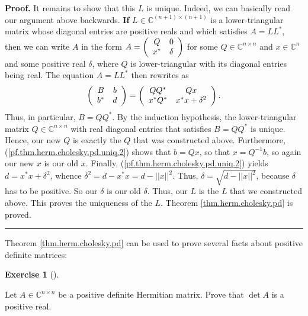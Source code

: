 \documentclass[numbers=enddot,12pt,final,onecolumn,notitlepage]{scrartcl}%
\newcounter{exer}
\numberwithin{exer}{subsection}
\theoremstyle{definition}
\newtheorem{exmp}[exer]{Exercise}
\newenvironment{exercise}[1][]
{\begin{exmp}[#1]\begin{leftbar}}
{\end{leftbar}\end{exmp}}
\newenvironment{proof}[1][Proof]{\noindent\textbf{#1.} }{\ \rule{0.5em}{0.5em}}
\begin{document}
\begin{proof}
It remains to show that this $L$ is unique. Indeed, we can basically read our
argument above backwards. \textbf{If} $L\in\mathbb{C}^{\left(  n+1\right)
\times\left(  n+1\right)  }$ is a lower-triangular matrix whose diagonal
entries are positive reals and which satisfies $A=LL^{\ast}$, then we can
write $A$ in the form $A=\left(
\begin{array}
[c]{cc}%
Q & 0\\
x^{\ast} & \delta
\end{array}
\right)  $ for some $Q\in\mathbb{C}^{n\times n}$ and $x\in\mathbb{C}^{n}$ and
some positive real $\delta$, where $Q$ is lower-triangular with its diagonal
entries being real. The equation $A=LL^{\ast}$ then rewrites as%
\begin{equation}
\left(
\begin{array}
[c]{cc}%
B & b\\
b^{\ast} & d
\end{array}
\right)  =\left(
\begin{array}
[c]{cc}%
QQ^{\ast} & Qx\\
x^{\ast}Q^{\ast} & x^{\ast}x+\delta^{2}%
\end{array}
\right)  . \label{pf.thm.herm.cholesky.pd.uniq.2}%
\end{equation}
Thus, in particular, $B=QQ^{\ast}$. By the induction hypothesis, the
lower-triangular matrix $Q\in\mathbb{C}^{n\times n}$ with real diagonal
entries that satisfies $B=QQ^{\ast}$ is unique. Hence, our new $Q$ is exactly
the $Q$ that was constructed above. Furthermore,
(\ref{pf.thm.herm.cholesky.pd.uniq.2}) shows that $b=Qx$, so that $x=Q^{-1}b$,
so again our new $x$ is our old $x$. Finally,
(\ref{pf.thm.herm.cholesky.pd.uniq.2}) yields $d=x^{\ast}x+\delta^{2}$, whence
$\delta^{2}=d-x^{\ast}x=d-\left\vert \left\vert x\right\vert \right\vert ^{2}%
$. Thus, $\delta=\sqrt{d-\left\vert \left\vert x\right\vert \right\vert ^{2}}%
$, because $\delta$ has to be positive. So our $\delta$ is our old $\delta$.
Thus, our $L$ is the $L$ that we constructed above. This proves the uniqueness
of the $L$. Theorem \ref{thm.herm.cholesky.pd} is proved.
\end{proof}

Theorem \ref{thm.herm.cholesky.pd} can be used to prove several facts about
positive definite matrices:

\begin{exercise}
 Let $A\in\mathbb{C}^{n\times n}$ be a positive definite Hermitian
matrix. Prove that $\det A$ is a positive real.
\end{exercise}
\end{document}
